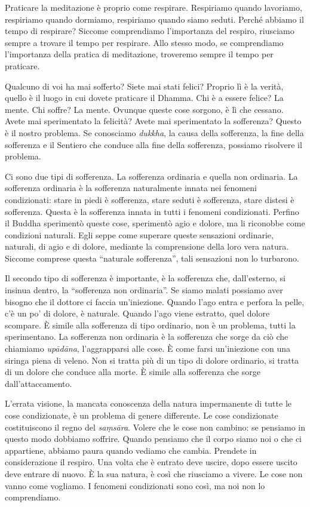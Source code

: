 Praticare la meditazione è proprio come respirare. Respiriamo quando
lavoriamo, respiriamo quando dormiamo, respiriamo quando siamo seduti.
Perché abbiamo il tempo di respirare? Siccome comprendiamo l'importanza
del respiro, riusciamo sempre a trovare il tempo per respirare. Allo
stesso modo, se comprendiamo l'importanza della pratica di meditazione,
troveremo sempre il tempo per praticare.

Qualcuno di voi ha mai sofferto? Siete mai stati felici? Proprio lì è la
verità, quello è il luogo in cui dovete praticare il Dhamma. Chi è a
essere felice? La mente. Chi soffre? La mente. Ovunque queste cose
sorgono, è lì che cessano. Avete mai sperimentato la felicità? Avete mai
sperimentato la sofferenza? Questo è il nostro problema. Se conosciamo
\emph{dukkha}, la causa della sofferenza, la fine della sofferenza e il
Sentiero che conduce alla fine della sofferenza, possiamo risolvere il
problema.

Ci sono due tipi di sofferenza. La sofferenza ordinaria e quella non
ordinaria. La sofferenza ordinaria è la sofferenza naturalmente innata
nei fenomeni condizionati: stare in piedi è sofferenza, stare seduti è
sofferenza, stare distesi è sofferenza. Questa è la sofferenza innata in
tutti i fenomeni condizionati. Perfino il Buddha sperimentò queste cose,
sperimentò agio e dolore, ma li riconobbe come condizioni naturali. Egli
seppe come superare queste sensazioni ordinarie, naturali, di agio e di
dolore, mediante la comprensione della loro vera natura. Siccome
comprese questa ``naturale sofferenza'', tali sensazioni non lo
turbarono.

Il secondo tipo di sofferenza è importante, è la sofferenza che,
dall'esterno, si insinua dentro, la ``sofferenza non ordinaria''. Se
siamo malati possiamo aver bisogno che il dottore ci faccia
un'iniezione. Quando l'ago entra e perfora la pelle, c'è un po' di
dolore, è naturale. Quando l'ago viene estratto, quel dolore scompare. È
simile alla sofferenza di tipo ordinario, non è un problema, tutti la
sperimentano. La sofferenza non ordinaria è la sofferenza che sorge da
ciò che chiamiamo \emph{upādāna}, l'aggrapparsi alle cose. È come farsi
un'iniezione con una siringa piena di veleno. Non si tratta più di un
tipo di dolore ordinario, si tratta di un dolore che conduce alla morte.
È simile alla sofferenza che sorge dall'attaccamento.

L'errata visione, la mancata conoscenza della natura impermanente di
tutte le cose condizionate, è un problema di genere differente. Le cose
condizionate costituiscono il regno del \emph{saṃsāra}. Volere che le
cose non cambino: se pensiamo in questo modo dobbiamo soffrire. Quando
pensiamo che il corpo siamo noi o che ci appartiene, abbiamo paura
quando vediamo che cambia. Prendete in considerazione il respiro. Una
volta che è entrato deve uscire, dopo essere uscito deve entrare di
nuovo. È la sua natura, è così che riusciamo a vivere. Le cose non vanno
come vogliamo. I fenomeni condizionati sono così, ma noi non lo
comprendiamo.

